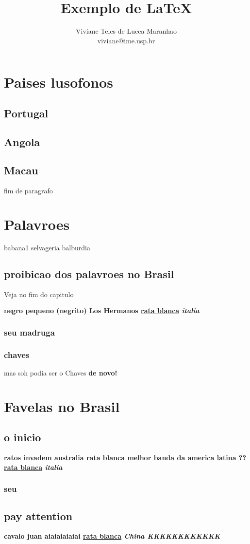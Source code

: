 \documentclass[12pt]{article} %
\title{Exemplo de \LaTeX} %
\author{Viviane Teles de Lucca Maranhao \\ viviane@ime.usp.br} %
\begin{document}
\chapter{Paises lusofonos}
\section{Portugal}
\section{Angola}
\section{Macau}
fim de paragrafo\par
\chapter{Palavroes}
babana1
selvageria
balburdia
\section{proibicao dos palavroes no Brasil}
Veja no fim do capitulo\par
\bf{negro pequeno (negrito)} Los Hermanos 
\underline{rata blanca} \it{italia}\par
\subsection{seu madruga}
\subsection{chaves}
mas soh podia ser o Chaves 
\bf{de novo!}\par
\chapter{Favelas no Brasil}
\section{o inicio}
\bf{ratos invadem australia} rata blanca melhor banda da america latina ?? 
\underline{rata blanca} \it{italia}\par
\subsection{seu}
\section{pay attention}
\bf{cavalo juan}  aiaiaiaiaiai 
\underline{rata blanca} \it{China KKKKKKKKKKKK}\par
\end{document}
